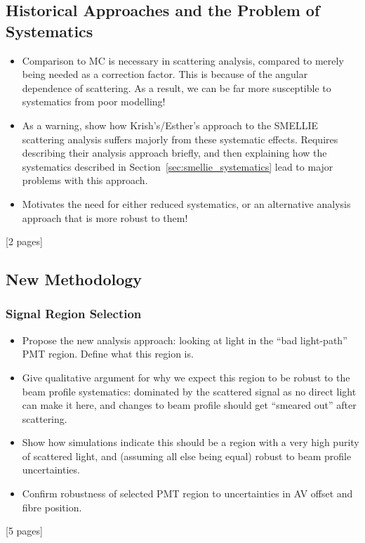 {\subsection{Historical Approaches and the Problem of Systematics}
\begin{itemize}
    \item Comparison to MC is necessary in scattering analysis, compared to merely being needed as a correction factor. This is because of the angular dependence of scattering. As a result, we can be far more susceptible to systematics from poor modelling!
    \item As a warning, show how Krish's/Esther's approach to the SMELLIE scattering analysis suffers majorly from these systematic effects. Requires describing their analysis approach briefly, and then explaining how the systematics described in Section~\ref{sec:smellie_systematics} lead to major problems with this approach.
    \item Motivates the need for either reduced systematics, or an alternative analysis approach that is more robust to them!
\end{itemize}
[2 pages]
\subsection{New Methodology}
\subsubsection{Signal Region Selection}
\begin{itemize}
    \item Propose the new analysis approach: looking at light in the ``bad light-path'' PMT region. Define what this region is.
    \item Give qualitative argument for why we expect this region to be robust to the beam profile systematics: dominated by the scattered signal as no direct light can make it here, and changes to beam profile should get ``smeared out'' after scattering.
    \item Show how simulations indicate this should be a region with a very high purity of scattered light, and (assuming all else being equal) robust to beam profile uncertainties.
    \item Confirm robustness of selected PMT region to uncertainties in AV offset and fibre position.
\end{itemize}
[5 pages]
}
